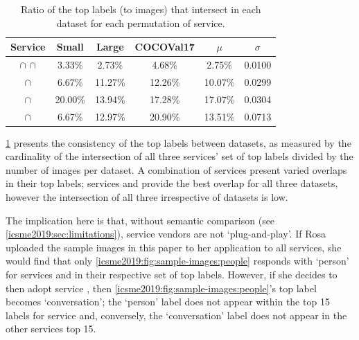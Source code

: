 \begin{table}[t]
\caption[Ratio of consistent labels in computer vision services]{Ratio of the top labels (to images) that intersect in each dataset for each permutation of service.}
\label{icsme2019:tab:intersect-of-labels}
\centering
\begin{tabular}{c||c|c|c||c|c}
  \toprule
  \textbf{Service} & \textbf{Small} & \textbf{Large} & \textbf{COCOVal17} & \textbf{$\mu$} & \textbf{$\sigma$} \\
  \midrule
  \googleapi{} $\cap$ \azureapi{} $\cap$ \awsapi{}  & 3.33\%   & 2.73\%   & 4.68\%   & 2.75\%  & 0.0100  \\
  \googleapi{} $\cap$ \azureapi{}                   & 6.67\%   & 11.27\%  & 12.26\%  & 10.07\% & 0.0299 \\
  \googleapi{} $\cap$ \awsapi{}                     & 20.00\%  & 13.94\%  & 17.28\%  & 17.07\% & 0.0304 \\
  \azureapi{} $\cap$ \awsapi{}                      & 6.67\%   & 12.97\%  & 20.90\%  & 13.51\% & 0.0713 \\
  \bottomrule
\end{tabular}
\end{table}

\cref{icsme2019:tab:intersect-of-labels} presents the consistency of the top labels between datasets, as measured by the cardinality of the intersection of all three services' set of top labels divided by the number of images per dataset. A combination of services present varied overlaps in their top labels; services \googleapi{} and \awsapi{} provide the best overlap for all three datasets, however the intersection of all three irrespective of datasets is low.



The implication here is that, without semantic comparison (see \cref{icsme2019:sec:limitations}), service vendors are not `plug-and-play'. If Rosa uploaded the sample images in this paper to her application to all services, she would find that only \cref{icsme2019:fig:sample-images:people} responds with `person' for services  \azureapi{} and \awsapi{} in their respective set of top labels. However, if she decides to then adopt service \googleapi{}, then \cref{icsme2019:fig:sample-images:people}'s top label becomes `conversation'; the `person' label does not appear within the top 15 labels for service \googleapi{} and, conversely, the `conversation' label does not appear in the other services top 15. 

